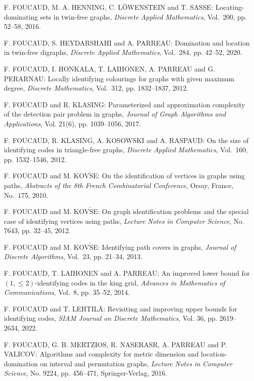 \begin{thebibliography}{999}
 F. FOUCAUD, M. A. HENNING, C. L\"{O}WENSTEIN and T. SASSE: Locating-dominating sets in twin-free graphs, {\it Discrete Applied Mathematics}, Vol.~200, pp. 52--58, 2016.

F. FOUCAUD, S. HEYDARSHAHI and A. PARREAU: Domination and location in twin-free digraphs, {\it Discrete Applied Mathematics}, Vol.~284, pp. 42--52, 2020.

F. FOUCAUD, I. HONKALA, T. LAIHONEN, A. PARREAU and G. PERARNAU: Locally identifying colourings for graphs with given maximum degree, {\it Discrete Mathematics}, Vol.~312, pp. 1832--1837, 2012.

F. FOUCAUD and R. KLASING: Parameterized and approximation complexity of the detection pair problem in graphs, {\it Journal of Graph Algorithms and Applications}, Vol. 21(6), pp. 1039--1056, 2017.

F. FOUCAUD, R. KLASING, A. KOSOWSKI and A. RASPAUD: On the size of identifying codes in triangle-free graphs, {\it Discrete Applied Mathematics}, Vol.~160, pp. 1532--1546, 2012.

F. FOUCAUD and M. KOV$\check{\textrm{S}}$E: On the identification of vertices in graphs using paths, {\it Abstracts of the 8th French Combinatorial Conference}, Orsay, France, No.~175, 2010.

F. FOUCAUD and M. KOV$\check{\textrm{S}}$E: On graph identification problems and the special case of identifying vertices using paths, {\it Lecture Notes in Computer Science}, No. 7643, pp. 32--45, 2012.

F. FOUCAUD and M. KOV$\check{\textrm{S}}$E: Identifying path covers in graphs, {\it Journal of Discrete Algorithms}, Vol.~23, pp. 21--34, 2013.

F. FOUCAUD, T. LAIHONEN and A. PARREAU: An improved lower bound for $(1, \leq 2)$-identifying codes in the king grid, {\it Advances in Mathematics of Communications}, Vol.~8, pp. 35--52, 2014.

F. FOUCAUD and T. LEHTIL\"A: Revisiting and improving upper bounds for identifying codes, {\it SIAM Journal on Discrete Mathematics}, Vol. 36, pp. 2619--2634, 2022.

F. FOUCAUD, G. B. MERTZIOS, R. NASERASR, A. PARREAU and P. VALICOV: Algorithms and complexity for metric dimension and location-domination on interval and permutation graphs, {\it Lecture Notes in Computer Science}, No. 9224, pp. 456--471, Springer-Verlag, 2016.


\end{thebibliography}
